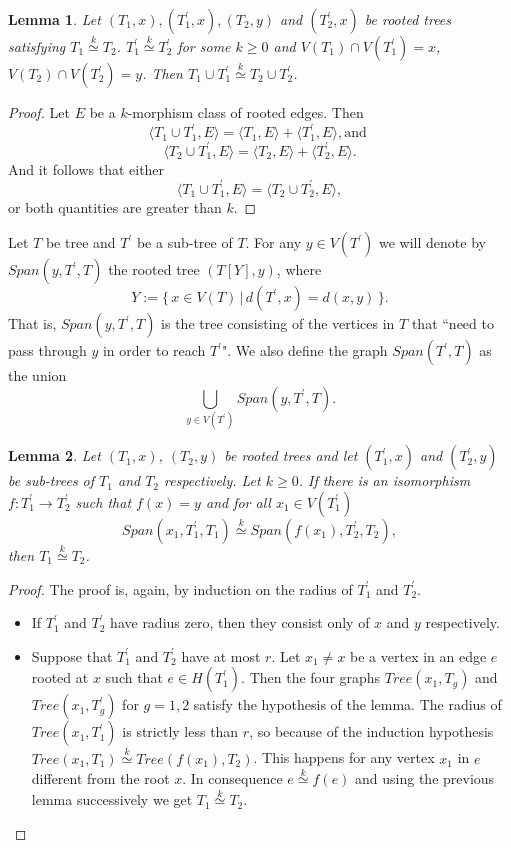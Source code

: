 \documentclass[11pt,notitlepage]{report}
\newtheorem{lemma}{Lemma}[chapter]
\theoremstyle{definition}
\newcommand{\morph}[1]{\stackrel{#1}{\simeq}}
\begin{document}
\begin{lemma}\label{lem:addtrees}
	Let $(T_1,x),(T^\prime_1,x), (T_2, y)$ and $(T^\prime_2,x)$ 
	be rooted trees satisfying $T_1\morph{k} T_2$.
	$T_1^\prime\morph{k} T_2^\prime$ for some 
	$k\geq 0$ and $V(T_1)\cap V(T_1^\prime)=x$, 
	$V(T_2)\cap V(T_2^\prime)=y$. Then
	$T_1\cup T_1^\prime \morph{k} T_2\cup T_2^\prime$.
\end{lemma}
\begin{proof}
	Let $E$ be a $k$-morphism class of rooted edges. Then
	\[\langle T_1\cup T_1^\prime,E \rangle = \langle T_1,E \rangle + \langle T_1^\prime,E \rangle , \text{and }\]
	\[\langle T_2\cup T_1^\prime,E \rangle = \langle T_2,E \rangle + \langle T_2^\prime,E \rangle .\]
	And it follows that either
	\[\langle T_1\cup T_1^\prime,E \rangle =\langle T_2\cup T_2^\prime,E \rangle ,\]
	or both quantities are greater than $k$. 
\end{proof}


Let $T$ be  tree and $T^\prime$ be a sub-tree of $T$. For any 
$y\in V(T^\prime)$ we will denote by $Span(y, T^\prime, T)$ the 
rooted tree $(T[Y],y)$, where
\[ Y:= \{ \, x\in V(T) \, | \, d(T^\prime,x)=d(x,y) \,  \}	.\]
That is, $Span(y, T^\prime, T)$ is the tree consisting of the vertices
in $T$ that ``need to pass through $y$ in order to reach $T^\prime$".
We also define the graph $Span(T^\prime, T)$ as the union 
\[ \bigcup_{y\in V(T^\prime)} Span(y,T^\prime, T).  \]

\begin{lemma} \label{lem:isosubtree}
	Let $(T_1,x)$, $(T_2, y)$ be rooted trees and let 
	$(T^\prime_1,x)$ and $(T^\prime_2,y)$ be sub-trees of 
	$T_1$ and $T_2$ respectively. Let $k\geq 0$.
	If there is an isomorphism 
	$f:T^\prime_1 \rightarrow T^\prime_2$ such that $f(x)=y$ and
	for all $x_1\in V(T^\prime_1)$
	\[ Span(x_1,T^\prime_1,T_1)\morph{k} Span(f(x_1),T^\prime_2,T_2),\]
	then $T_1\morph{k}T_2$. 
\end{lemma}
\begin{proof}
	The proof is, again, by induction on the radius of $T^\prime_1$ and $T^\prime_2$.
	\begin{itemize}[leftmargin=*]
		\item If $T^\prime_1$ and $T^\prime_2$ have radius zero, then they consist only of
		$x$ and $y$ respectively. 
		\item Suppose that $T^\prime_1$ and $T^\prime_2$ have at most $r$. Let $x_1\neq x$ be
		a vertex in an edge $e$ rooted at $x$ such that $e\in H(T^\prime_1)$.
		Then the four graphs $Tree(x_1, T_g)$ and $Tree(x_1,T^\prime_g)$ 
		for $g=1,2$ satisfy the hypothesis of the lemma.
		The radius of $Tree(x_1,T^\prime_1)$ is strictly less than $r$, so 
		because of the induction
		hypothesis $Tree(x_1, T_1)\morph{k} Tree(f(x_1),T_2)$. 
		This happens for any vertex $x_1$ in $e$ different from the root $x$.
		In consequence $e\morph{k}f(e)$ 
		and using the previous lemma successively we get $T_1\morph{k} T_2$.
	\end{itemize}
\end{proof}
\end{document}
